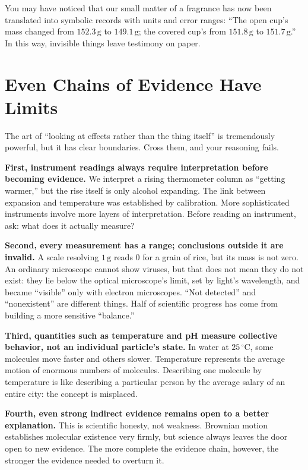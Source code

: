You may have noticed that our small matter of a fragrance has now been translated into symbolic records with units and error ranges: ``The open cup's mass changed from $152.3\,\mathrm{g}$ to $149.1\,\mathrm{g}$; the covered cup's from $151.8\,\mathrm{g}$ to $151.7\,\mathrm{g}$.'' In this way, invisible things leave testimony on paper.

\section{Even Chains of Evidence Have Limits}

The art of ``looking at effects rather than the thing itself'' is tremendously powerful, but it has clear boundaries. Cross them, and your reasoning fails.

\textbf{First, instrument readings always require interpretation before becoming evidence.} We interpret a rising thermometer column as ``getting warmer,'' but the rise itself is only alcohol expanding. The link between expansion and temperature was established by calibration. More sophisticated instruments involve more layers of interpretation. Before reading an instrument, ask: what does it actually measure?

\textbf{Second, every measurement has a range; conclusions outside it are invalid.} A scale resolving $1\,\mathrm{g}$ reads $0$ for a grain of rice, but its mass is not zero. An ordinary microscope cannot show viruses, but that does not mean they do not exist: they lie below the optical microscope's limit, set by light's wavelength, and became ``visible'' only with electron microscopes. ``Not detected'' and ``nonexistent'' are different things. Half of scientific progress has come from building a more sensitive ``balance.''

\textbf{Third, quantities such as temperature and pH measure collective behavior, not an individual particle's state.} In water at $25\,^{\circ}\mathrm{C}$, some molecules move faster and others slower. Temperature represents the average motion of enormous numbers of molecules. Describing one molecule by temperature is like describing a particular person by the average salary of an entire city: the concept is misplaced.

\textbf{Fourth, even strong indirect evidence remains open to a better explanation.} This is scientific honesty, not weakness. Brownian motion establishes molecular existence very firmly, but science always leaves the door open to new evidence. The more complete the evidence chain, however, the stronger the evidence needed to overturn it.

